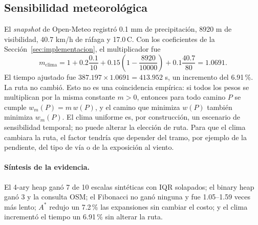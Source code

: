 \subsection{Sensibilidad meteorológica}
El \textit{snapshot} de Open-Meteo registró 0.1 mm de precipitación, 8920 m de visibilidad, 40.7 km/h de ráfaga y 17.0\,\textdegree C. Con los coeficientes de la Sección~\ref{sec:implementacion}, el multiplicador fue
\begin{equation}
    m_{\text{clima}}=1+0.2\frac{0.1}{10}+0.15\left(1-\frac{8920}{10000}\right)+0.1\frac{40.7}{80}=1.0691.
    \label{eq:clima_aplicado}
\end{equation}
El tiempo ajustado fue $387.197\times1.0691=413.952$ s, un incremento del 6.91\,\%. La ruta no cambió. Esto no es una coincidencia empírica: si todos los pesos se multiplican por la misma constante $m>0$, entonces para todo camino $P$ se cumple $w_m(P)=m\,w(P)$, y el camino que minimiza $w(P)$ también minimiza $w_m(P)$. El clima uniforme es, por construcción, un escenario de sensibilidad temporal; no puede alterar la elección de ruta. Para que el clima cambiara la ruta, el factor tendría que depender del tramo, por ejemplo de la pendiente, del tipo de vía o de la exposición al viento.

\paragraph{Síntesis de la evidencia.} El 4-ary heap ganó 7 de 10 escalas sintéticas con IQR solapados; el binary heap ganó 3 y la consulta OSM; el Fibonacci no ganó ninguna y fue 1.05--1.59 veces más lento; $A^*$ redujo un 7.2\,\% las expansiones sin cambiar el costo; y el clima incrementó el tiempo un 6.91\,\% sin alterar la ruta.
